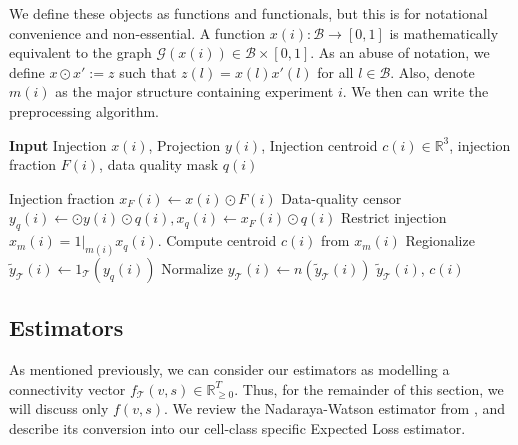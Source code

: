 We define these objects as functions and functionals, but this is for notational convenience and non-essential.
A function $x(i):\mathcal B \to [0,1]$ is mathematically equivalent to the graph $\mathcal G(x(i)) \in \mathcal B \times [0,1]$.
As an abuse of notation, we define $x \odot x' := z$ such that $z(l) = x(l) x'(l)$ for all $l \in \mathcal B$.
Also, denote $m(i)$ as the major structure containing experiment $i$.
We then can write the preprocessing algorithm.

\begin{algorithm}[H]
\caption{{\bf Input} Injection $x(i)$, Projection $y(i)$, Injection centroid $c(i) \in \mathbb R^3$, injection fraction $F(i)$, data quality mask $q(i)$}
\label{alg:preprocess}
\begin{algorithmic}
\State Injection fraction $x_F(i) \gets x(i) \odot F(i)$
\State Data-quality censor $y_q (i) \gets  \odot y(i) \odot q(i) , x_q(i) \gets x_F(i) \odot q(i)$
\State Restrict injection $x_m(i) = 1 |_{m(i)} x_q(i) $.
\State Compute centroid $c(i)$ from $x_m(i) $
\State Regionalize $\tilde y_{\mathcal T} (i) \gets 1_{\mathcal T}(  y_q(i))$
\State Normalize $ y_{\mathcal T} (i) \gets n(\tilde y_{\mathcal T} (i) )$
 $\tilde y_{\mathcal T} (i) $, $c(i)$ 
\end{algorithmic}
\end{algorithm}



\newpage
\subsection{Estimators}
\label{supp_sec:estimators}
As mentioned previously, we can consider our estimators as modelling a connectivity vector $f_{\mathcal T} (v,s)  \in \mathbb R_{\geq 0}^T$.
Thus, for the remainder of this section, we will discuss only $f (v,s)$.
We review the Nadaraya-Watson estimator from  \citet{Knox2019-ot}, and describe its conversion into our cell-class specific Expected Loss estimator.

